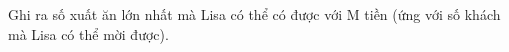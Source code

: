 Ghi ra số xuất ăn lớn nhất mà Lisa có thể có được với M tiền (ứng với số khách mà Lisa có thể mời được).

\